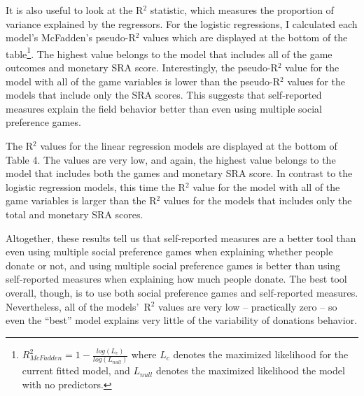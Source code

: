 \documentclass[12pt]{article}
\begin{document}
It is also useful to look at the R$^{2}$ statistic, which measures the proportion of variance explained by the regressors. For the logistic regressions, I calculated each model\rq s McFadden\rq s pseudo-R$^{2}$ values which are displayed at the bottom of the table\footnote{
\(R^{2}_{McFadden} = 1 - \frac{log(L_{c})}{log(L_{null})}\)
where \(L_{c}\) denotes the maximized likelihood for the current fitted model, and \(L_{null}\) denotes the maximized likelihood the model with no predictors.
}. The highest value belongs to the model that includes all of the game outcomes and monetary SRA score. Interestingly, the pseudo-R$^{2}$ value for the model with all of the game variables is lower than the pseudo-R$^{2}$ values for the models that include only the SRA scores. This suggests that self-reported measures explain the field behavior better than even using multiple social preference games. 

The R$^{2}$ values for the linear regression models are displayed at the bottom of Table 4. The values are very low, and again, the highest value belongs to the model that includes both the games and monetary SRA score. In contrast to the logistic regression models, this time the R$^{2}$ value for the model with all of the game variables is larger than the R$^{2}$ values for the models that includes only the total and monetary SRA scores. 

Altogether, these results tell us that self-reported measures are a better tool than even using multiple social preference games when explaining whether people donate or not, and using multiple social preference games is better than using self-reported measures when explaining how much people donate. The best tool overall, though, is to use both social preference games and self-reported measures. Nevertheless, all of the models\rq \ R$^{2}$ values are very low -- practically zero -- so even the ``best'' model explains very little of the variability of donations behavior.
\end{document}
